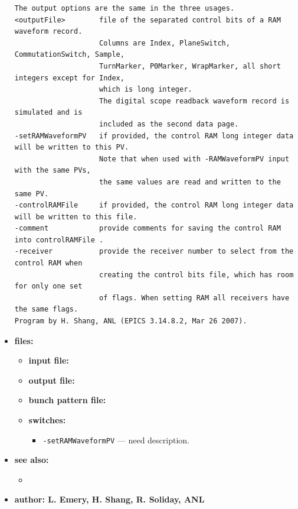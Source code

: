 \begin{itemize}
\begin{verbatim}
The output options are the same in the three usages.
<outputFile>        file of the separated control bits of a RAM waveform record. 
                    Columns are Index, PlaneSwitch, CommutationSwitch, Sample, 
                    TurnMarker, P0Marker, WrapMarker, all short integers except for Index, 
                    which is long integer.
                    The digital scope readback waveform record is simulated and is 
                    included as the second data page. 
-setRAMWaveformPV   if provided, the control RAM long integer data will be written to this PV. 
                    Note that when used with -RAMWaveformPV input with the same PVs, 
                    the same values are read and written to the same PV. 
-controlRAMFile     if provided, the control RAM long integer data will be written to this file. 
-comment            provide comments for saving the control RAM into controlRAMFile .
-receiver           provide the receiver number to select from the control RAM when 
                    creating the control bits file, which has room for only one set 
                    of flags. When setting RAM all receivers have the same flags. 
Program by H. Shang, ANL (EPICS 3.14.8.2, Mar 26 2007).

\end{verbatim}
\normalsize

\item {\bf files:}
\begin{itemize}
\item {\bf input file:} \par

\item {\bf output file:} \par 

\item {\bf bunch pattern file:} \par

%
\item {\bf switches:}
%
%
    \begin{itemize}
%
%
    \item {\tt -setRAMWaveformPV} --- need description.
      
    \end{itemize}
\end{itemize}

\item {\bf see also:}
    \begin{itemize}
%
%
    \item {}
    \end{itemize}
%
%
\item {\bf author: L. Emery, H. Shang, R. Soliday, ANL}
\end{itemize}
